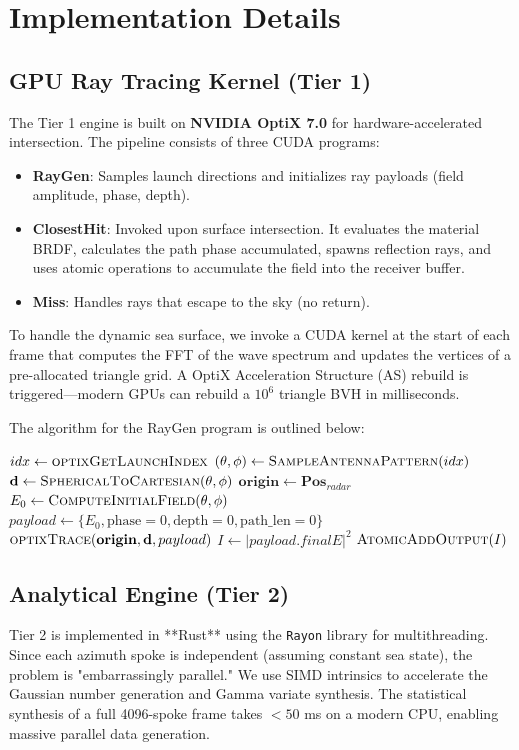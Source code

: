 \documentclass[conf]{new-aiaa}
\begin{document}
\section{Implementation Details}

\subsection{GPU Ray Tracing Kernel (Tier 1)}
The Tier 1 engine is built on \textbf{NVIDIA OptiX 7.0} for hardware-accelerated intersection. The pipeline consists of three CUDA programs:
\begin{itemize}
    \item \textbf{RayGen}: Samples launch directions and initializes ray payloads (field amplitude, phase, depth).
    \item \textbf{ClosestHit}: Invoked upon surface intersection. It evaluates the material BRDF, calculates the path phase accumulated, spawns reflection rays, and uses atomic operations to accumulate the field into the receiver buffer.
    \item \textbf{Miss}: Handles rays that escape to the sky (no return).
\end{itemize}
To handle the dynamic sea surface, we invoke a CUDA kernel at the start of each frame that computes the FFT of the wave spectrum and updates the vertices of a pre-allocated triangle grid. A OptiX Acceleration Structure (AS) rebuild is triggered—modern GPUs can rebuild a $10^6$ triangle BVH in milliseconds.

The algorithm for the RayGen program is outlined below:
\begin{algorithm}
\caption{Ray Generation Kernel (Simplified)}
\label{alg:raygen}
\begin{algorithmic}[1]
    \State $idx \gets \Call{optixGetLaunchIndex}{}$
    \State $(\theta, \phi) \gets \Call{SampleAntennaPattern}{idx}$
    \State $\mathbf{d} \gets \Call{SphericalToCartesian}{\theta, \phi}$
    \State $\mathbf{origin} \gets \mathbf{Pos}_{radar}$
    \State $E_0 \gets \Call{ComputeInitialField}{\theta, \phi}$
    \State $payload \gets \{E_0, \text{phase}=0, \text{depth}=0, \text{path\_len}=0\}$
    \State $\Call{optixTrace}{\mathbf{origin}, \mathbf{d}, payload}$
    \State $I \gets |payload.finalE|^2$
    \State $\Call{AtomicAddOutput}{I}$
\EndFunction
\end{algorithmic}
\end{algorithm}

\subsection{Analytical Engine (Tier 2)}
Tier 2 is implemented in **Rust** using the \texttt{Rayon} library for multithreading. Since each azimuth spoke is independent (assuming constant sea state), the problem is "embarrassingly parallel." We use SIMD intrinsics to accelerate the Gaussian number generation and Gamma variate synthesis. The statistical synthesis of a full 4096-spoke frame takes $< 50$ ms on a modern CPU, enabling massive parallel data generation.
\end{document}
